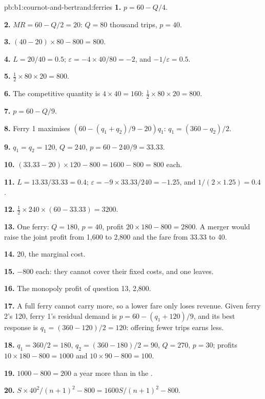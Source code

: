 \begin{solution}{pb:b1:cournot-and-bertrand:ferries}
\textbf{1.} $p = 60 - Q/4$.

\textbf{2.} $MR = 60 - Q/2 = 20$: $Q = 80$ thousand trips, $p = 40$.

\textbf{3.} $(40 - 20) \times 80 - 800 = 800$.

\textbf{4.} $L = 20/40 = 0.5$; $\varepsilon = -4 \times 40/80 = -2$, and $-1/\varepsilon = 0.5$.

\textbf{5.} $\tfrac12 \times 80 \times 20 = 800$.

\textbf{6.} The competitive quantity is $4 \times 40 = 160$: $\tfrac12 \times 80 \times 20 = 800$.

\textbf{7.} $p = 60 - Q/9$.

\textbf{8.} Ferry 1 maximises $(60 - (q_1 + q_2)/9 - 20)q_1$: $q_1 = (360 - q_2)/2$.

\textbf{9.} $q_1 = q_2 = 120$, $Q = 240$, $p = 60 - 240/9 = 33.33$.

\textbf{10.} $(33.33 - 20) \times 120 - 800 = 1600 - 800 = 800$ each.

\textbf{11.} $L = 13.33/33.33 = 0.4$; $\varepsilon = -9 \times 33.33/240 = -1.25$, and $1/(2 \times 1.25) = 0.4$.

\textbf{12.} $\tfrac12 \times 240 \times (60 - 33.33) = 3200$.

\textbf{13.} One ferry: $Q = 180$, $p = 40$, profit $20 \times 180 - 800 = 2800$. A merger would
raise the joint profit from 1,600 to 2,800 and the fare from 33.33 to 40.

\textbf{14.} 20, the marginal cost.

\textbf{15.} $-800$ each: they cannot cover their fixed costs, and one leaves.

\textbf{16.} The monopoly profit of question 13, 2,800.

\textbf{17.} A full ferry cannot carry more, so a lower fare only loses
revenue. Given ferry 2's 120, ferry 1's residual demand is $p = 60 - (q_1 + 120)/9$,
and its best response is $q_1 = (360 - 120)/2 = 120$: offering fewer trips earns
less.

\textbf{18.} $q_1 = 360/2 = 180$, $q_2 = (360 - 180)/2 = 90$, $Q = 270$, $p = 30$; profits
$10 \times 180 - 800 = 1000$ and $10 \times 90 - 800 = 100$.

\textbf{19.} $1000 - 800 = 200$ a year more than in the .

\textbf{20.} $S \times 40^2/(n + 1)^2 - 800 = 1600S/(n + 1)^2 - 800$.


\end{solution}
